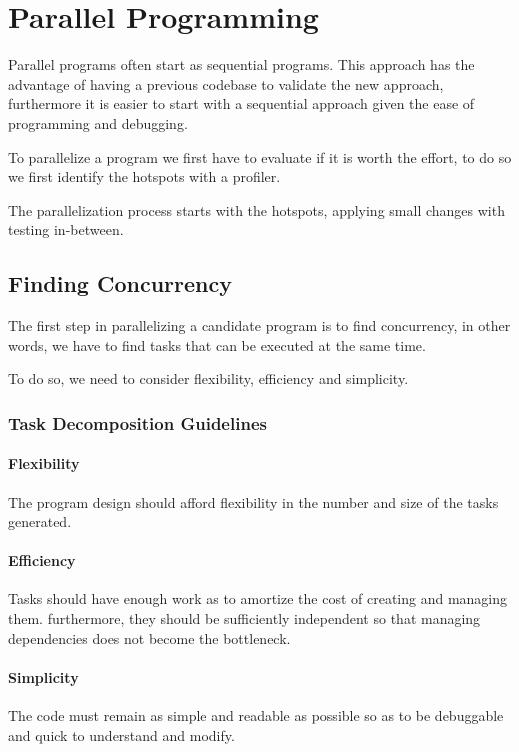 \section{Parallel Programming}

Parallel programs often start as sequential programs.
This approach has the advantage of having a previous codebase to validate the new approach,
furthermore it is easier to start with a sequential approach given the ease of programming and debugging.

To parallelize a program we first have to evaluate if it is worth the effort,
to do so we first identify the hotspots with a profiler.

The parallelization process starts with the hotspots,
applying small changes with testing in-between.

\subsection{Finding Concurrency}

The first step in parallelizing a candidate program is to find concurrency,
in other words, we have to find tasks that can be executed at the same time.

To do so, we need to consider flexibility, efficiency and simplicity.

\subsubsection{Task Decomposition Guidelines}

\paragraph{Flexibility}
The program design should afford flexibility in the number and size of the tasks generated.

\paragraph{Efficiency}
Tasks should have enough work as to amortize the cost of creating and managing them.
furthermore, they should be sufficiently independent so that managing dependencies does not become the bottleneck.

\paragraph{Simplicity}
The code must remain as simple and readable as possible so as to be debuggable and quick to understand and modify.

